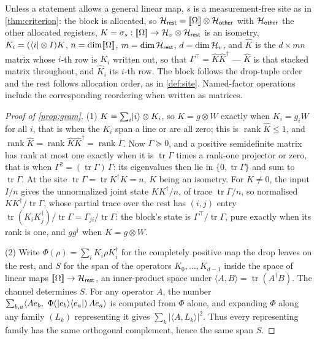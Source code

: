 \documentclass[acmsmall,screen,review,anonymous,nonacm]{acmart}
\begin{document}
Unless a statement allows a general linear map, $s$ is a measurement-free
site as in \cref{thm:criterion}: the block is allocated,
so $\mathcal{H}_{\mathsf{rest}} = [\![\Omega]\!] \otimes \mathcal{H}_{\mathsf{other}}$ with $\mathcal{H}_{\mathsf{other}}$ the other allocated
registers, $K = \sigma_s : [\![\Omega]\!] \to \mathcal{H}_{v} \otimes \mathcal{H}_{\mathsf{rest}}$ is an
isometry, $K_i = (\langle i \rvert \otimes I)K$, $n = \dim[\![\Omega]\!]$, $m =
\dim\mathcal{H}_{\mathsf{rest}}$, $d = \dim\mathcal{H}_{v}$, and $\hat K$ is the $d \times mn$ matrix whose
$i$-th row is $K_i$ written out, so that $\Gamma^{\top} = \hat K\hat K^{\dagger}$
--- $\hat K$ is that stacked matrix throughout, and $\hat K_i$ its $i$-th
row. The block follows the drop-tuple order and the rest follows allocation
order, as in \cref{def:site}. Named-factor operations include the
corresponding reordering when written as matrices.

\begin{proof}[Proof of \cref{prop:gram}]
(1) $K = \sum_i \lvert i \rangle \otimes K_i$, so $K = g \otimes W$ exactly when
$K_i = g_i W$ for all $i$, that is when the $K_i$ span a line or are all
zero; this is $\operatorname{rank} \hat K \le 1$, and $\operatorname{rank} \hat K =
\operatorname{rank} \hat K\hat K^{\dagger} = \operatorname{rank}\Gamma$. Now
$\Gamma \succeq 0$, and a positive semidefinite matrix has rank at most one
exactly when it is $\operatorname{tr}\Gamma$ times a rank-one projector or zero, that
is when $\Gamma^{2} = (\operatorname{tr}\Gamma)\,\Gamma$: its eigenvalues then lie in
$\{0, \operatorname{tr}\Gamma\}$ and sum to $\operatorname{tr}\Gamma$. At the site
$\operatorname{tr}\Gamma = \operatorname{tr} K^{\dagger}K = n$, $K$ being an isometry.
For $K\ne0$, the input $I/n$ gives the unnormalized joint state $KK^{\dagger}/n$, of trace $\operatorname{tr}\Gamma/n$, so normalised
$KK^{\dagger}/\operatorname{tr}\Gamma$, whose partial trace over the rest has $(i,j)$ entry
$\operatorname{tr}(K_iK_j^{\dagger})/\operatorname{tr}\Gamma =
\Gamma_{ji}/\operatorname{tr}\Gamma$: the block's
state is $\Gamma^{\top}/\operatorname{tr}\Gamma$, pure exactly when its rank is one, and
$gg^{\dagger}$ when $K = g \otimes W$.

(2) Write $\Phi(\rho) = \sum_i K_i\rho K_i^{\dagger}$ for the completely positive map the drop leaves on the
rest, and $S$ for the span of the operators $K_0, \ldots, K_{d-1}$ inside the space of
linear maps $[\![\Omega]\!] \to \mathcal{H}_{\mathsf{rest}}$, an inner-product space under
$\langle A, B\rangle = \operatorname{tr}(A^{\dagger}B)$.
The channel determines $S$. For any operator $A$, the number
$\sum_{b,a}\langle A e_b,\ \Phi(\ket{e_b}\bra{e_a})\,A e_a\rangle$ is computed from
$\Phi$ alone, and expanding $\Phi$ along any family $(L_k)$ representing it gives
$\sum_k |\langle A, L_k\rangle|^{2}$.
Thus every representing family has the same orthogonal complement, hence
the same span $S$.


\end{proof}
\end{document}

